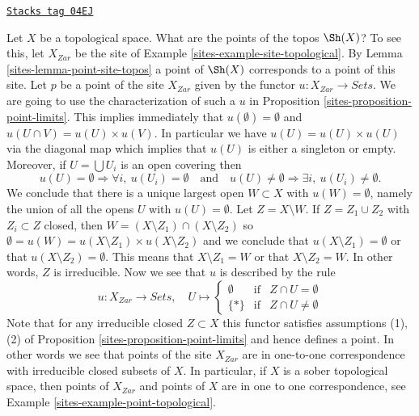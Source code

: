 \begin{example}
\label{sites-example-point-topology}
\href{https://stacks.math.columbia.edu/tag/04EJ}{\texttt{Stacks tag 04EJ}}

Let $X$ be a topological space. What are the points of the topos
$\Sh(X)$? To see this, let $X_{Zar}$ be the site of
Example \ref{sites-example-site-topological}.
By
Lemma \ref{sites-lemma-point-site-topos}
a point of $\Sh(X)$ corresponds to a point of this site.
Let $p$ be a point of the site $X_{Zar}$ given by the functor
$u : X_{Zar} \to \textit{Sets}$. We are going to use the
characterization of such a $u$ in
Proposition \ref{sites-proposition-point-limits}.
This implies immediately that $u(\emptyset) = \emptyset$ and
$u(U \cap V) = u(U) \times u(V)$. In particular we have
$u(U) = u(U) \times u(U)$ via the diagonal map which implies that $u(U)$
is either a singleton or empty. Moreover, if $U = \bigcup U_i$ is an
open covering then
$$
u(U) = \emptyset \Rightarrow \forall i, \ u(U_i) = \emptyset
\quad\text{and}\quad
u(U) \not = \emptyset \Rightarrow \exists i, \ u(U_i) \not = \emptyset.
$$
We conclude that there is a unique largest open $W \subset X$ with
$u(W) = \emptyset$, namely the union of all the opens $U$ with
$u(U) = \emptyset$. Let $Z = X \setminus W$. If $Z = Z_1 \cup Z_2$ with
$Z_i \subset Z$ closed, then $W = (X \setminus Z_1) \cap (X \setminus Z_2)$
so $\emptyset = u(W) = u(X \setminus Z_1) \times u(X \setminus Z_2)$
and we conclude that $u(X \setminus Z_1) = \emptyset$ or that
$u(X \setminus Z_2) = \emptyset$. This means that $X \setminus Z_1 = W$
or that $X \setminus Z_2 = W$. In other words, $Z$ is irreducible.
Now we see that $u$ is described by the rule
$$
u : X_{Zar} \longrightarrow \textit{Sets}, \quad
U \mapsto
\left\{
\begin{matrix}
\emptyset & \text{if} & Z \cap U = \emptyset \\
\{*\} & \text{if} & Z \cap U \not = \emptyset
\end{matrix}
\right.
$$
Note that for any irreducible closed $Z \subset X$ this
functor satisfies assumptions (1), (2) of
Proposition \ref{sites-proposition-point-limits}
and hence defines a point. In other words we see that points of
the site $X_{Zar}$ are in one-to-one correspondence with
irreducible closed subsets of $X$. In particular, if $X$ is
a sober topological space, then points of $X_{Zar}$ and
points of $X$ are in one to one correspondence, see
Example \ref{sites-example-point-topological}.
\end{example}

